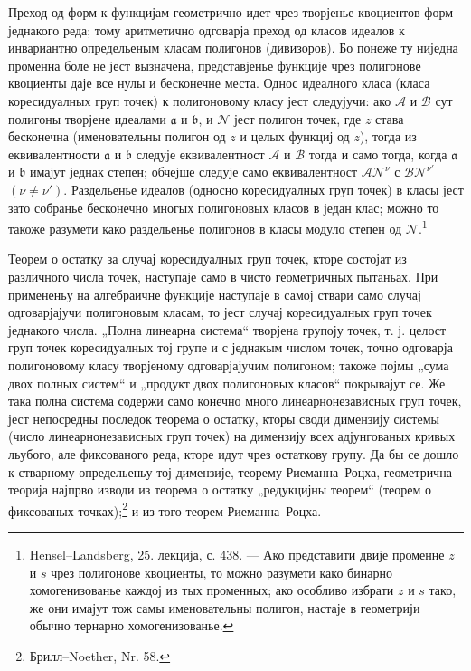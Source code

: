﻿\documentclass[11pt]{article}
\providecommand{\fra}{\mathfrak a}
\providecommand{\frb}{\mathfrak b}
\providecommand{\calA}{\mathcal A}
\providecommand{\calB}{\mathcal B}
\providecommand{\calN}{\mathcal N}
\begin{document}
Преход од форм к функцијам геометрично идет чрез творјенье квоциентов форм једнакого реда; тому аритметично одговарја преход од класов идеалов к инвариантно определьеным класам полигонов (дивизоров). Бо понеже ту ниједна променна боле не јест вызначена, представјенье функције чрез полигонове квоциенты даје все нулы и бесконечне места. Однос идеалного класа (класа коресидуалных груп точек) к полигоновому класу јест следујучи: ако \(\calA\) и \(\calB\) сут полигоны творјене идеалами \(\fra\) и \(\frb\), и \(\calN\) јест полигон точек, где \(z\) става бесконечна (именовательны полигон од \(z\) и целых функциј од \(z\)), тогда из еквивалентности \(\fra\) и \(\frb\) следује еквивалентност \(\calA\) и \(\calB\) тогда и само тогда, когда \(\fra\) и \(\frb\) имајут једнак степен; обчејше следује само еквивалентност \(\calA\calN^\nu\) с \(\calB\calN^{\nu'}\) \((\nu\ne\nu')\). Раздельенье идеалов (односно коресидуалных груп точек) в класы јест зато собранье бесконечно многых полигоновых класов в један клас; можно то такоже разумети како раздельенье полигонов в класы модуло степен од \(\calN\).\footnote{Hensel--Landsberg, 25. лекција, с. 438. --- Ако представити двије променне \(z\) и \(s\) чрез полигонове квоциенты, то можно разумети како бинарно хомогенизованье каждој из тых променных; ако особливо избрати \(z\) и \(s\) тако, же они имајут тож самы именовательны полигон, настаје в геометрији обычно тернарно хомогенизованье.}

Теорем о остатку за случај коресидуалных груп точек, кторе состојат из различного числа точек, наступаје само в чисто геометричных пытаньах. При примененьу на алгебраичне функције наступаје в самој ствари само случај одговарјајучи полигоновым класам, то јест случај коресидуалных груп точек једнакого числа. „Полна линеарна система“ творјена групоју точек, т. ј. целост груп точек коресидуалных тој групе и с једнакым числом точек, точно одговарја полигоновому класу творјеному одговарјајучим полигоном; такоже појмы „сума двох полных систем“ и „продукт двох полигоновых класов“ покрывајут се. Же така полна система содержи само конечно много линеарнонезависных груп точек, јест непосредны последок теорема о остатку, кторы своди димензију системы (число линеарнонезависных груп точек) на димензију всех адјунгованых кривых льубого, але фиксованого реда, кторе идут чрез остаткову групу. Да бы се дошло к стварному определьеньу тој димензије, теорему Риеманна--Роцха, геометрична теорија најпрво изводи из теорема о остатку „редукцијны теорем“ (теорем о фиксованых точках);\footnote{Брилл--Noether, Nr. 58.} и из того теорем Риеманна--Роцха.
\end{document}
